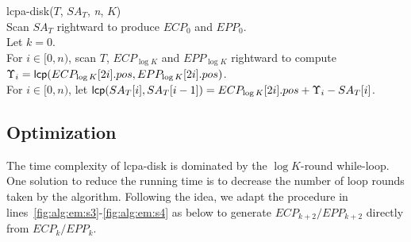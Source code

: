 \documentclass[10pt,journal,compsoc]{IEEEtran}
\begin{document}
\begin{CJK*}{GBK}{song}
\begin{algorithm}[hbtp!]
\caption{Compute $K$-Order $LCPA_T$ in Disk}
\label{fig:alg:em}
lcpa-disk($T$, $SA_T$, {\em n}, $K$){\\
\SetAlgoNoLine
Scan $SA_T$ rightward to produce $ECP_0$ and $EPP_0$. \\
Let $k = 0$. \\
\While{$k < \log K$}{
\Indentp{-1em}
Radix-sort $ECP_k$ and $EPP_k$ by $pos$ to produce $IECP_k$ and $IEPP_k$. \label{fig:alg:em:s1}\\
For $i\in [0,n)$ and $j\in [0,2n)$, scan $T$ rightward to iteratively compute the fingerprint of ${\sf pre}(T,i)$ and assign $FP[0,i]$ to $IECP_k[j].fp$ or $IEPP_k[j].fp$ if $IECP_k[j].pos = i$ or $IEPP_k[j].pos = i$. \\
Radix-sort $IECP_k$ and $IEPP_k$ by $idx$ to reproduce $ECP_k$ and $EPP_k$. \label{fig:alg:em:s2}\\
For $i \in [0,n)$, scan $ECP_k$ and $EPP_k$ rightward to compute and compare each pair of $(FP[ECP_k[2i].pos+1,ECP_k[2i+1].pos], FP[EPP_k[2i].pos+1,EPP_k[2i+1].pos])$ for generating $ECP_{k+1}$ and $EPP_{k+1}$. \label{fig:alg:em:s3}\\
Let $k = k + 1$. \label{fig:alg:em:s4}\\
}
For $i \in [0,n)$, scan $T$, $ECP_{\log K}$ and $EPP_{\log K}$ rightward to compute $\Upsilon_i = {\sf lcp}(ECP_{\log K}[2i].pos,EPP_{\log K}[2i].pos)$. \\
For $i \in [0,n)$, let ${\sf lcp}(SA_T[i],SA_T[i-1])=ECP_{\log K}[2i].pos+\Upsilon_i-SA_T[i]$.\\
}
\end{algorithm}

\subsection{Optimization}\label{subsec:optimization}
The time complexity of lcpa-disk is dominated by the $\log K$-round while-loop. One solution to reduce the running time is to decrease the number of loop rounds taken by the algorithm. Following the idea, we adapt the procedure in lines~\ref{fig:alg:em:s3}-\ref{fig:alg:em:s4} as below to generate $ECP_{k+2}/EPP_{k+2}$ directly from $ECP_k/EPP_k$.


\end{CJK*}
\end{document}
